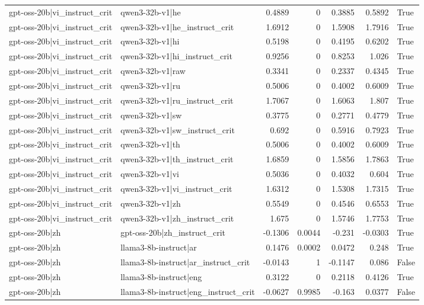\begin{table}
\begin{tabular}{l l r r r r l}
gpt-oss-20b|vi_instruct_crit & qwen3-32b-v1|he & 0.4889 & 0 & 0.3885 & 0.5892 & True \\
gpt-oss-20b|vi_instruct_crit & qwen3-32b-v1|he_instruct_crit & 1.6912 & 0 & 1.5908 & 1.7916 & True \\
gpt-oss-20b|vi_instruct_crit & qwen3-32b-v1|hi & 0.5198 & 0 & 0.4195 & 0.6202 & True \\
gpt-oss-20b|vi_instruct_crit & qwen3-32b-v1|hi_instruct_crit & 0.9256 & 0 & 0.8253 & 1.026 & True \\
gpt-oss-20b|vi_instruct_crit & qwen3-32b-v1|raw & 0.3341 & 0 & 0.2337 & 0.4345 & True \\
gpt-oss-20b|vi_instruct_crit & qwen3-32b-v1|ru & 0.5006 & 0 & 0.4002 & 0.6009 & True \\
gpt-oss-20b|vi_instruct_crit & qwen3-32b-v1|ru_instruct_crit & 1.7067 & 0 & 1.6063 & 1.807 & True \\
gpt-oss-20b|vi_instruct_crit & qwen3-32b-v1|sw & 0.3775 & 0 & 0.2771 & 0.4779 & True \\
gpt-oss-20b|vi_instruct_crit & qwen3-32b-v1|sw_instruct_crit & 0.692 & 0 & 0.5916 & 0.7923 & True \\
gpt-oss-20b|vi_instruct_crit & qwen3-32b-v1|th & 0.5006 & 0 & 0.4002 & 0.6009 & True \\
gpt-oss-20b|vi_instruct_crit & qwen3-32b-v1|th_instruct_crit & 1.6859 & 0 & 1.5856 & 1.7863 & True \\
gpt-oss-20b|vi_instruct_crit & qwen3-32b-v1|vi & 0.5036 & 0 & 0.4032 & 0.604 & True \\
gpt-oss-20b|vi_instruct_crit & qwen3-32b-v1|vi_instruct_crit & 1.6312 & 0 & 1.5308 & 1.7315 & True \\
gpt-oss-20b|vi_instruct_crit & qwen3-32b-v1|zh & 0.5549 & 0 & 0.4546 & 0.6553 & True \\
gpt-oss-20b|vi_instruct_crit & qwen3-32b-v1|zh_instruct_crit & 1.675 & 0 & 1.5746 & 1.7753 & True \\
gpt-oss-20b|zh & gpt-oss-20b|zh_instruct_crit & -0.1306 & 0.0044 & -0.231 & -0.0303 & True \\
gpt-oss-20b|zh & llama3-8b-instruct|ar & 0.1476 & 0.0002 & 0.0472 & 0.248 & True \\
gpt-oss-20b|zh & llama3-8b-instruct|ar_instruct_crit & -0.0143 & 1 & -0.1147 & 0.086 & False \\
gpt-oss-20b|zh & llama3-8b-instruct|eng & 0.3122 & 0 & 0.2118 & 0.4126 & True \\
gpt-oss-20b|zh & llama3-8b-instruct|eng_instruct_crit & -0.0627 & 0.9985 & -0.163 & 0.0377 & False \\

\end{tabular}
\end{table}

